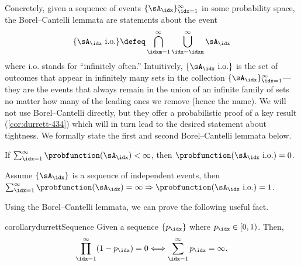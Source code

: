 Concretely, given a sequence of events $\{\sA_\idx\}_{\idx=1}^\infty$ in some probability space, the Borel--Cantelli lemmata are statements about the event
\begin{equation} \label{eq:defn-io}
    \{\sA_\idx \text{ i.o.}\}\defeq\bigcap_{\idxm=1}^\infty\bigcup_{\idx=\idxm}^\infty \sA_\idx
\end{equation}
where i.o. stands for ``infinitely often.''
Intuitively, $\{\sA_\idx \text{ i.o.}\}$ is the set of outcomes that appear in infinitely many sets in the collection $\{\sA_\idx\}_{\idx=1}^\infty$---they are the events that always remain in the union of an infinite family of sets no matter how many of the leading ones we remove (hence the name).
We will not use Borel--Cantelli directly, but they offer a probabilistic proof of a key result (\cref{cor:durrett-434}) which will in turn lead to the desired statement about tightness.
We formally state the first and second Borel--Cantelli lemmata below.
\begin{lemma} \label{thm:bc1}
If $\sum_{\idx=1}^\infty\probfunction(\sA_\idx) < \infty$, then $\probfunction(\sA_\idx \text{ i.o.})=0$.
\end{lemma}

\begin{lemma} \label{thm:bc2}
Assume $\{\sA_\idx\}$ is a sequence of independent events, then $\sum_{\idx=1}^\infty \probfunction(\sA_\idx) = \infty \Rightarrow \probfunction(\sA_\idx \text{ i.o.})=1$.
\end{lemma}

Using the Borel--Cantelli lemmata, we can prove the following useful fact.
\begin{restatable}{corollary}{durrettSequence}
\label{cor:durrett-434}
Given a sequence $\{p_\idx\}$ where $p_\idx\in[0,1)$. Then,
\begin{equation}
    \prod_{\idx=1}^\infty (1-p_\idx) = 0 \Longleftrightarrow \sum_{\idx=1}^\infty p_\idx=\infty.
\end{equation}
\end{restatable}


